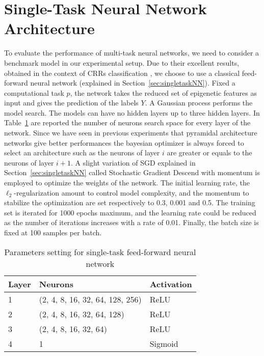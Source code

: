 \section{Single-Task Neural Network Architecture} 
\label{sec:exp_setup_singletask}
To evaluate the performance of multi-task neural networks, we need to consider a benchmark model in our experimental setup. Due to their excellent results, obtained in the context of CRRs classification \cite{WassermannDECRES}, we choose to use a classical feed-forward neural network (explained in Section~\ref{sec:singletaskNN}). Fixed a computational task $p$, the network takes the reduced set of epigenetic features as input and gives the prediction of the labels $Y$. A Gaussian process performs the model search. The models can have no hidden layers up to three hidden layers. In Table~\ref{tab:mlp_single_arch} are reported the number of neurons search space for every layer of the network. Since we have seen in previous experiments that pyramidal architecture networks give better performances the bayesian optimizer is always forced to select an architecture such as the neurons of layer $i$ are greater or equals to the neurons of layer $i+1$. 
A slight variation of SGD explained in Section~\ref{sec:singletaskNN} called Stochastic Gradient Descend with momentum is employed to optimize the weights of the network. The initial learning rate, the $\ell_2$-regularization amount to control model complexity, and the momentum to stabilize the optimization are set respectively to 0.3, 0.001 and 0.5. The training set is iterated for 1000 epochs maximum, and the learning rate could be reduced as the number of iterations increases with a rate of 0.01. Finally, the batch size is fixed at 100 samples per batch.  
\begin{table}[t]
\centering
\begin{tabular}{lll}
\toprule
\textbf{Layer} & \textbf{Neurons} & \textbf{Activation} \\ 
\midrule
1 & (2, 4, 8, 16, 32, 64, 128, 256) & ReLU \\ 
2 & (2, 4, 8, 16, 32, 64, 128) & ReLU \\ 
3 & (2, 4, 8, 16, 32, 64) & ReLU \\ 
4 & 1 & Sigmoid \\ 
\bottomrule
\end{tabular}
\caption{Parameters setting for single-task feed-forward neural network}
\label{tab:mlp_single_arch}
\end{table}

